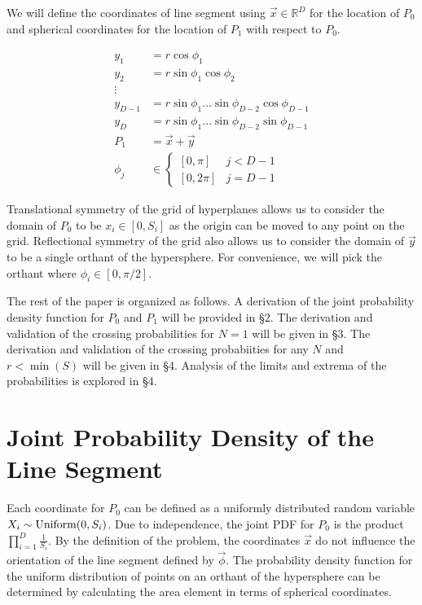\documentclass{article}
\begin{document}
We will define the coordinates of line segment using $\vec{x}\in\mathbb{R}^D$ for the location of $P_0$ and spherical coordinates for the location of $P_1$ with respect to $P_0$.

\begin{align*}
    y_1 &= r\cos{\phi_1}\\
    y_2 &= r\sin{\phi_1}\cos{\phi_2}\\
    \vdots\\
    y_{D-1} &= r\sin{\phi_1}\hdots\sin{\phi_{D-2}}\cos{\phi_{D-1}}\\
    y_{D} &= r\sin{\phi_1}\hdots\sin{\phi_{D-2}}\sin{\phi_{D-1}}\\
    P_1 &= \vec{x} + \vec{y}\\
	\phi_j &\in \begin{cases}[0, \pi] & j<D-1 \\ [0, 2\pi] & j=D-1\end{cases}
\end{align*}

Translational symmetry of the grid of hyperplanes allows us to consider the domain of $P_0$ to be $x_i\in[0,S_i]$ as the origin can be moved to any point on the grid.
Reflectional symmetry of the grid also allows us to consider the domain of $\vec{y}$ to be a single orthant of the hypersphere. For convenience, we will pick the orthant where
$\phi_i \in [0, \pi/2]$.

The rest of the paper is organized as follows. A derivation of the joint probability density function for $P_0$ and $P_1$ will be provided in \S 2. The derivation and validation
of the crossing probabilities for $N=1$ will be given in \S 3. The derivation and validation of the crossing probabiities for any $N$ and $r<\min(S)$ will be given in \S 4. Analysis of the limits
and extrema of the probabilities is explored in \S 4.

\section{Joint Probability Density of the Line Segment}
Each coordinate for $P_0$ can be defined as a uniformly distributed random variable $X_i\sim{\rm Uniform}(0,S_i)$. Due to independence, the joint PDF for $P_0$ is the product
$\prod_{i=1}^D \frac{1}{S_i}$. By the definition of the problem, the coordinates $\vec{x}$ do not influence the orientation of the line segment defined by $\vec{\phi}$. 
The probability density function for the uniform distribution of points on an orthant of the hypersphere can be determined by calculating the area element in terms of spherical coordinates.
\end{document}
